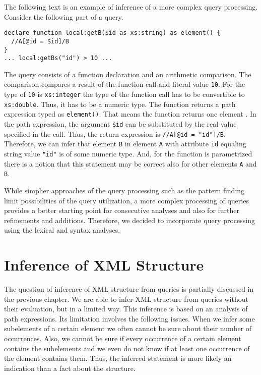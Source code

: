 The following text is an example of inference of a more complex query processing. Consider the following part of a query.
\begin{verbatim}
declare function local:getB($id as xs:string) as element() {
  //A[@id = $id]/B
}
... local:getBs("id") > 10 ...
\end{verbatim}
The query consists of a function declaration and an arithmetic comparison. The comparison compares a result of the function call and literal value \texttt{10}. For the type of \texttt{10} is \texttt{xs:integer} the type of the function call has to be convertible to \texttt{xs:double}. Thus, it has to be a numeric type. The function returns a path expression typed as \texttt{element()}. That means the function returns one element . In the path expression, the argument \texttt{\$id} can be substituted by the real value specified in the call. Thus, the return expression is \texttt{//A[@id = "id"]/B}. Therefore, we can infer that element \texttt{B} in element \texttt{A} with attribute \texttt{id} equaling string value \texttt{"id"} is of some numeric type. And, for the function is parametrized  there is a notion that this statement may be correct also for other elements \texttt{A} and \texttt{B}.

While simplier approaches of the query processing such as the pattern finding limit possibilities of the query utilization, a more complex processing of queries provides a better starting point for consecutive analyses and also for further refinements and additions. Therefore, we decided to incorporate query processing using the lexical and syntax analyses.

\section{Inference of XML Structure}
The question of inference of XML structure from queries is partially discussed in the previous chapter. We are able to infer XML structure from queries without their evaluation, but in a limited way. This inference is based on an analysis of path expressions. Its limitation involves the following issues. When we infer some subelements of a certain element we often cannot be sure about their number of occurrences. Also, we cannot be sure if every occurrence of a certain element contains the subelements and we even do not know if at least one occurrence of the element contains them. Thus, the inferred statement is more likely an indication than a fact about the structure.

